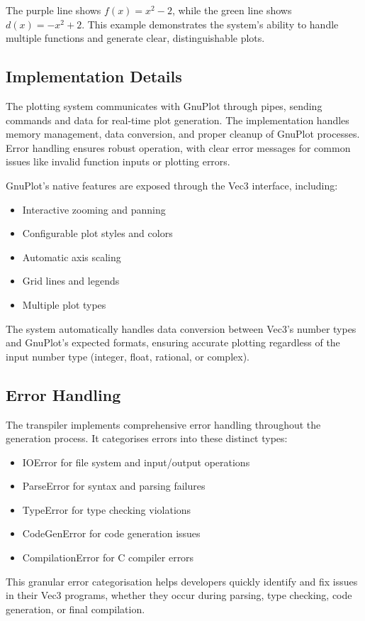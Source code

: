 The purple line shows $f(x) = x^2 - 2$, while the green line shows $d(x) = -x^2 + 2$. This example demonstrates the system's ability to handle multiple functions and generate clear, distinguishable plots.

\subsection{Implementation Details}\label{subsec:plotting-implementation}

The plotting system communicates with GnuPlot through pipes, sending commands and data for real-time plot generation. The implementation handles memory management, data conversion, and proper cleanup of GnuPlot processes. Error handling ensures robust operation, with clear error messages for common issues like invalid function inputs or plotting errors.

GnuPlot's native features are exposed through the Vec3 interface, including:
\begin{itemize}
    \item Interactive zooming and panning
    \item Configurable plot styles and colors
    \item Automatic axis scaling
    \item Grid lines and legends
    \item Multiple plot types
\end{itemize}
The system automatically handles data conversion between Vec3's number types and GnuPlot's expected formats, ensuring accurate plotting regardless of the input number type (integer, float, rational, or complex).

\subsection{Error Handling}
The transpiler implements comprehensive error handling throughout the generation process. 
It categorises errors into these distinct types:
\begin{itemize}
\item IOError for file system and input/output operations
\item ParseError for syntax and parsing failures
\item TypeError for type checking violations
\item CodeGenError for code generation issues
\item CompilationError for C compiler errors
\end{itemize}
This granular error categorisation helps developers quickly identify and fix issues in their Vec3 programs, whether they occur during parsing, type checking, code generation, or final compilation.
